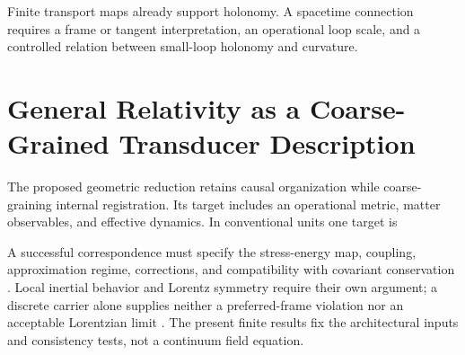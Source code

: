 Finite transport maps already support holonomy. A spacetime connection requires a frame or tangent interpretation, an operational loop scale, and a controlled relation between small-loop holonomy and curvature.

\section{General Relativity as a Coarse-Grained Transducer Description}\label{sec:gr}
The proposed geometric reduction retains causal organization while coarse-graining internal registration. Its target includes an operational metric, matter observables, and effective dynamics. In conventional units one target is

A successful correspondence must specify the stress-energy map, coupling, approximation regime, corrections, and compatibility with covariant conservation \citep{carroll1997}. Local inertial behavior and Lorentz symmetry require their own argument; a discrete carrier alone supplies neither a preferred-frame violation nor an acceptable Lorentzian limit \citep{bombelli2009}. The present finite results fix the architectural inputs and consistency tests, not a continuum field equation.
